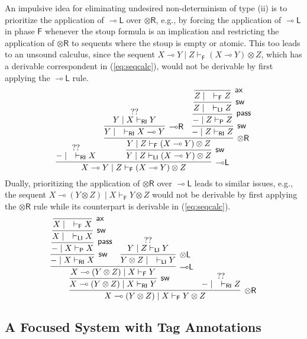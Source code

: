 \documentclass[copyright,creativecommons]{eptcs}
\theoremstyle{definition}
\newcommand{\tl}{\otimes \mathsf{L}}
\newcommand{\tr}{\otimes \mathsf{R}}
\newcommand{\lright}{{\multimap}\mathsf{R}}
\newcommand{\lleft}{{\multimap}\mathsf{L}}
\newcommand{\pass}{\mathsf{pass}}
\newcommand{\ax}{\mathsf{ax}}
\newcommand{\ot}{\otimes}
\newcommand{\lolli}{\multimap}
\newcommand{\RI}{\mathsf{RI}}
\newcommand{\LI}{\mathsf{LI}}
\newcommand{\Pass}{\mathsf{P}}
\newcommand{\F}{\mathsf{F}}
\begin{document}
An impulsive idea for eliminating undesired non-determinism of type (ii) is to prioritize the application of $\lleft$ over $\tr$, e.g., by forcing the application of $\lleft$ in phase $\F$ whenever the stoup formula is an implication and restricting the application of $\tr$ to sequents where the stoup is empty or atomic. This too leads to an unsound calculus, since the sequent $X \lolli Y \mid Z \vdash_{\F} (X \lolli Y) \ot Z$, which has a derivable correspondent in (\ref{eq:seqcalc}), would not be derivable by first applying the $\lleft$ rule.
\begin{equation*}\label{eq:counterexample1}
   \infer[\lleft]{X \lolli Y \mid Z \vdash_{\F} (X \lolli Y) \ot Z}{
     \deduce{{-} \mid \quad \vdash_{\RI} X}{??}
     &
     \infer[\mathsf{sw}]{Y \mid Z \vdash_{\LI} (X \lolli Y) \ot Z}{
       \infer[\tr]{Y \mid Z \vdash_{\F} (X \lolli Y) \ot Z}{
         \infer[\lright]{Y \mid \quad \vdash_{\RI} X \lolli Y}{
           \deduce{Y \mid X \vdash_{\RI} Y}{??}
         }
         &
         \infer[\mathsf{sw}]{{-} \mid Z \vdash_{\RI} Z}{
           \infer[\pass]{{-} \mid Z \vdash_{\Pass} Z}{
             \infer[\mathsf{sw}]{Z \mid \quad \vdash_{\LI} Z}{
               \infer[\ax]{Z \mid \quad \vdash_{\F} Z}{}
             }
           }
         }
       }
     }
   }
\end{equation*}
Dually, prioritizing the application of $\tr$ over $\lleft$ leads to similar issues, e.g., the sequent $X \lolli (Y \ot Z) \mid X \vdash_\F Y \ot Z$ would not be derivable by first applying the $\tr$ rule while its counterpart is derivable in  (\ref{eq:seqcalc}).
\begin{equation*}\label{eq:counterexample2}
\infer[\tr]{X \lolli (Y \ot Z) \mid X \vdash_{\F} Y \ot Z}{
  \infer[\mathsf{sw}]{X \lolli (Y \ot Z) \mid X \vdash_{\RI} Y}{
    \infer[\lleft]{X \lolli (Y \ot Z) \mid X \vdash_{\F} Y}{
      \infer[\mathsf{sw}]{{-}  \mid X \vdash_{\RI} X}{
        \infer[\pass]{{-}  \mid X \vdash_{\Pass} X}{
          \infer[\mathsf{sw}]{X \mid \quad \vdash_{\LI} X}{
            \infer[\ax]{X \mid \quad \vdash_{\F} X}{}
          }
        }
      }
      &
      \infer[\tl]{Y \ot Z \mid \quad \vdash_{\LI} Y}{
        \deduce{Y \mid Z \vdash_{\LI} Y}{??}
      }
    }
  }
  &
  \deduce{{-}  \mid \quad \vdash_{\RI} Z}{??}
}
\end{equation*}

\subsection{A Focused System with Tag Annotations}\label{sec:tag}
\end{document}
